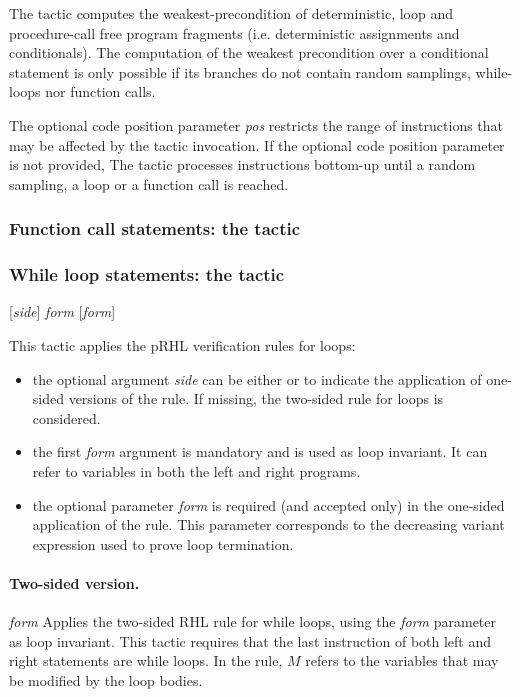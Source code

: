 \Description The  tactic computes the weakest-precondition of
deterministic, loop and procedure-call free program fragments
(i.e. deterministic assignments and conditionals).   
The computation of the weakest precondition over a
conditional statement is only possible if its branches do not
contain random samplings, while-loops nor function calls.

The optional code position parameter \textit{pos} restricts the range
of instructions that may be affected by the tactic invocation. 
%
If the optional code position parameter is not provided, The tactic
processes instructions bottom-up until a random sampling, a loop or a
function call is reached.


\subsubsection*{Function call statements: the  tactic}



\subsubsection*{While loop statements: the  tactic}

\Syntax  {} [\textit{side}] \textit{form} [\textit{form}]

\Description This tactic applies the pRHL verification rules for
loops:
\begin{itemize}
\item the optional argument \textit{side} can be either  or
   to indicate the application of one-sided versions of the
  rule. If missing, the two-sided rule for loops is considered.
\item the first \textit{form} argument is mandatory and is used as
  loop invariant. It can refer to variables in both the left and right
  programs.
\item the optional parameter \textit{form} is required (and accepted
  only) in the one-sided application of the rule. This parameter
  corresponds to the decreasing variant expression used to prove loop
  termination.
\end{itemize}



\paragraph{Two-sided version.}
%
\Syntax {} \textit{form} 
%
\Description Applies the two-sided RHL rule for while loops, using the
\textit{form} parameter as loop invariant. This tactic requires that
the last instruction of both left and right statements are while loops.
In the rule, $M$ refers to the variables that may be modified by the
loop bodies.

